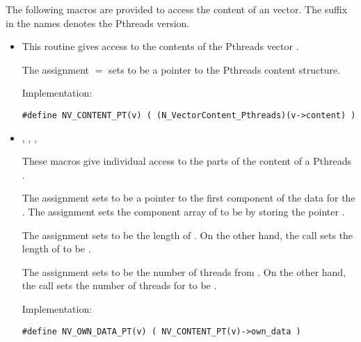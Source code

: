 The following macros are provided to access the content of an {\nvecpthreads}
vector. The suffix  in the names denotes the Pthreads version.
\begin{itemize}

\item {}                             
    
  This routine gives access to the contents of the Pthreads
  vector .
  
  The assignment  $=$  sets           
   to be a pointer to the Pthreads  content  
  structure.                                             
                                                            
  Implementation: 
  
  \verb|#define NV_CONTENT_PT(v) ( (N_VectorContent_Pthreads)(v->content) )|
  
\item {}, , , 


  These macros give individual access to the parts of    
  the content of a Pthreads .                        
                                                               
  The assignment  sets  to be     
  a pointer to the first component of the data for the  . 
  The assignment  sets the component array of  to     
  be  by storing the pointer .                   
  
  The assignment  sets  to be     
  the length of . On the other hand, the call  
  sets the length of  to be .
                                                            
  The assignment  sets  to be     
  the number of threads from . On the other hand, the call  
  sets the number of threads for  to be .
                                                            
  Implementation: 
  
  \verb|#define NV_OWN_DATA_PT(v) ( NV_CONTENT_PT(v)->own_data )|


\end{itemize}
